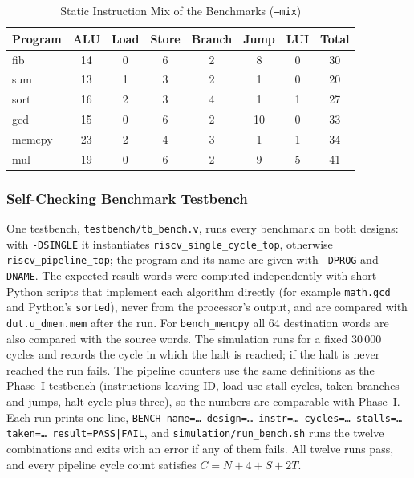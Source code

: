 \begin{table}[!t]
\centering
\caption{Static Instruction Mix of the Benchmarks (\texttt{--mix})}
\label{tab:mix}
\setlength{\tabcolsep}{3.5pt}
\renewcommand{\arraystretch}{1.08}
\begin{tabular}{@{}lccccccc@{}}
\toprule
\textbf{Program} & \textbf{ALU} & \textbf{Load} & \textbf{Store} & \textbf{Branch} & \textbf{Jump} & \textbf{LUI} & \textbf{Total} \\ \midrule
fib    & 14 & 0 & 6 & 2 & 8  & 0 & 30 \\
sum    & 13 & 1 & 3 & 2 & 1  & 0 & 20 \\
sort   & 16 & 2 & 3 & 4 & 1  & 1 & 27 \\
gcd    & 15 & 0 & 6 & 2 & 10 & 0 & 33 \\
memcpy & 23 & 2 & 4 & 3 & 1  & 1 & 34 \\
mul    & 19 & 0 & 6 & 2 & 9  & 5 & 41 \\ \bottomrule
\end{tabular}
\end{table}

\subsubsection{Self-Checking Benchmark Testbench}
One testbench, \texttt{testbench/tb\_bench.v}, runs every benchmark on both
designs: with \texttt{-DSINGLE} it instantiates \texttt{riscv\_single\_cycle\_top},
otherwise \texttt{riscv\_pipeline\_top}; the program and its name are given with
\texttt{-DPROG} and \texttt{-DNAME}. The expected result words were computed
independently with short Python scripts that implement each algorithm directly
(for example \texttt{math.gcd} and Python's \texttt{sorted}), never from the
processor's output, and are compared with \texttt{dut.u\_dmem.mem} after the run.
For \texttt{bench\_memcpy} all 64 destination words are also compared with the
source words. The simulation runs for a fixed 30\,000 cycles and records the
cycle in which the halt is reached; if the halt is never reached the run fails.
The pipeline counters use the same definitions as the Phase~I testbench
(instructions leaving ID, load-use stall cycles, taken branches and jumps, halt
cycle plus three), so the numbers are comparable with Phase~I. Each run prints
one line,
\texttt{BENCH name=\dots{} design=\dots{} instr=\dots{} cycles=\dots{} stalls=\dots{} taken=\dots{} result=PASS|FAIL},
and \texttt{simulation/run\_bench.sh} runs the twelve combinations and exits
with an error if any of them fails. All twelve runs pass, and every pipeline
cycle count satisfies $C = N + 4 + S + 2T$.
